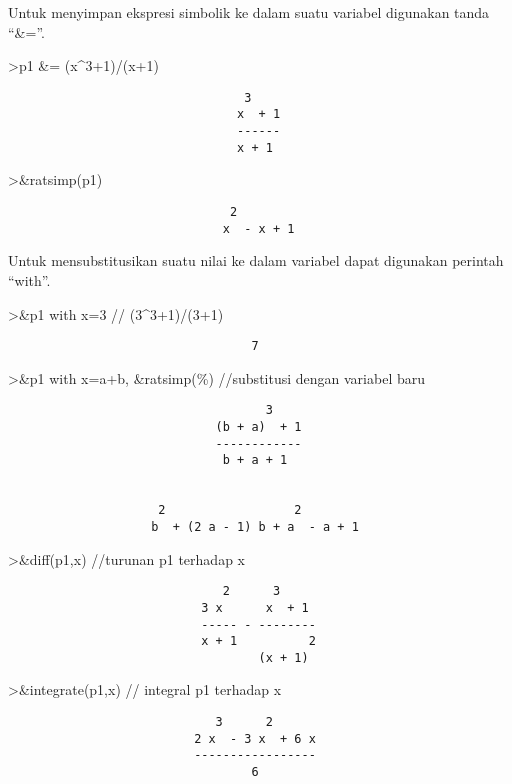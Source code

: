 \documentclass[
]{book}
\begin{document}
Untuk menyimpan ekspresi simbolik ke dalam suatu variabel digunakan tanda ``\&=''.

\textgreater p1 \&= (x\^{}3+1)/(x+1)

\begin{verbatim}
                                 3
                                x  + 1
                                ------
                                x + 1
\end{verbatim}

\textgreater\&ratsimp(p1)

\begin{verbatim}
                               2
                              x  - x + 1
\end{verbatim}

Untuk mensubstitusikan suatu nilai ke dalam variabel dapat digunakan perintah ``with''.

\textgreater\&p1 with x=3 // (3\^{}3+1)/(3+1)

\begin{verbatim}
                                  7
\end{verbatim}

\textgreater\&p1 with x=a+b, \&ratsimp(\%) //substitusi dengan variabel baru

\begin{verbatim}
                                    3
                             (b + a)  + 1
                             ------------
                              b + a + 1


                     2                  2
                    b  + (2 a - 1) b + a  - a + 1
\end{verbatim}

\textgreater\&diff(p1,x) //turunan p1 terhadap x

\begin{verbatim}
                              2      3
                           3 x      x  + 1
                           ----- - --------
                           x + 1          2
                                   (x + 1)
\end{verbatim}

\textgreater\&integrate(p1,x) // integral p1 terhadap x

\begin{verbatim}
                             3      2
                          2 x  - 3 x  + 6 x
                          -----------------
                                  6
\end{verbatim}
\end{document}
